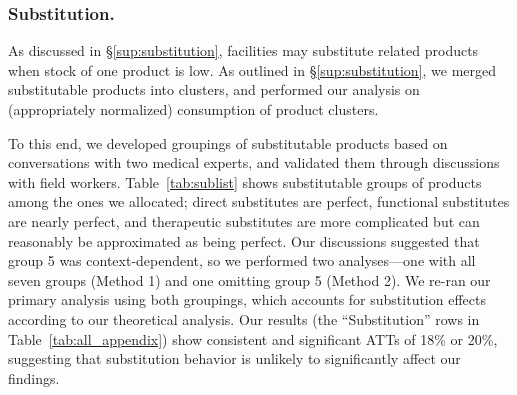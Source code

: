 \documentclass[12pt]{article}
\begin{document}
\subsubsection{Substitution.}
As discussed in \S\ref{sup:substitution}, facilities may substitute related products when stock of one product is low. As outlined in \S\ref{sup:substitution}, we merged substitutable products into clusters, and performed our analysis on (appropriately normalized) consumption of product clusters.

To this end, we developed groupings of substitutable products based on conversations with two medical experts, and validated them through discussions with field workers. Table~\ref{tab:sublist} shows substitutable groups of products among the ones we allocated; direct substitutes are perfect, functional substitutes are nearly perfect, and therapeutic substitutes are more complicated but can reasonably be approximated as being perfect. Our discussions suggested that group 5 was context-dependent, so we performed two analyses---one with all seven groups (Method 1) and one omitting group 5 (Method 2). We re-ran our primary analysis using both groupings, which accounts for substitution effects according to our theoretical analysis. Our results (the ``Substitution'' rows in Table~\ref{tab:all_appendix}) show consistent and significant ATTs of 18\% or 20\%, suggesting that substitution behavior is unlikely to significantly affect our findings.
\end{document}
